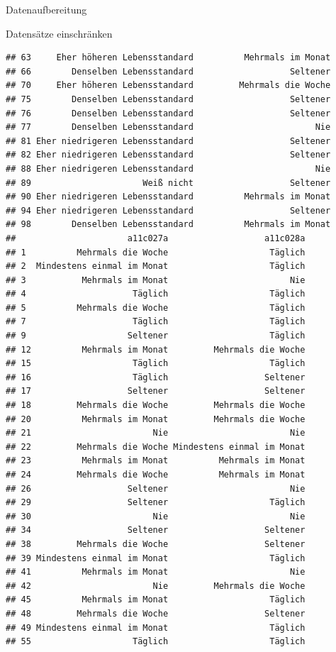 \documentclass[ignorenonframetext,]{beamer}
\begin{document}
\begin{frame}[fragile]{Datenaufbereitung}
\begin{block}{Datensätze einschränken}
\begin{verbatim}
## 63     Eher höheren Lebensstandard          Mehrmals im Monat
## 66        Denselben Lebensstandard                   Seltener
## 70     Eher höheren Lebensstandard         Mehrmals die Woche
## 75        Denselben Lebensstandard                   Seltener
## 76        Denselben Lebensstandard                   Seltener
## 77        Denselben Lebensstandard                        Nie
## 81 Eher niedrigeren Lebensstandard                   Seltener
## 82 Eher niedrigeren Lebensstandard                   Seltener
## 88 Eher niedrigeren Lebensstandard                        Nie
## 89                      Weiß nicht                   Seltener
## 90 Eher niedrigeren Lebensstandard          Mehrmals im Monat
## 94 Eher niedrigeren Lebensstandard                   Seltener
## 98        Denselben Lebensstandard          Mehrmals im Monat
##                      a11c027a                   a11c028a
## 1          Mehrmals die Woche                    Täglich
## 2  Mindestens einmal im Monat                    Täglich
## 3           Mehrmals im Monat                        Nie
## 4                     Täglich                    Täglich
## 5          Mehrmals die Woche                    Täglich
## 7                     Täglich                    Täglich
## 9                    Seltener                    Täglich
## 12          Mehrmals im Monat         Mehrmals die Woche
## 15                    Täglich                    Täglich
## 16                    Täglich                   Seltener
## 17                   Seltener                   Seltener
## 18         Mehrmals die Woche         Mehrmals die Woche
## 20          Mehrmals im Monat         Mehrmals die Woche
## 21                        Nie                        Nie
## 22         Mehrmals die Woche Mindestens einmal im Monat
## 23          Mehrmals im Monat          Mehrmals im Monat
## 24         Mehrmals die Woche          Mehrmals im Monat
## 26                   Seltener                        Nie
## 29                   Seltener                    Täglich
## 30                        Nie                        Nie
## 34                   Seltener                   Seltener
## 38         Mehrmals die Woche                   Seltener
## 39 Mindestens einmal im Monat                    Täglich
## 41          Mehrmals im Monat                        Nie
## 42                        Nie         Mehrmals die Woche
## 45          Mehrmals im Monat                    Täglich
## 48         Mehrmals die Woche                   Seltener
## 49 Mindestens einmal im Monat                    Täglich
## 55                    Täglich                    Täglich

\end{verbatim}
\end{block}
\end{frame}
\end{document}
